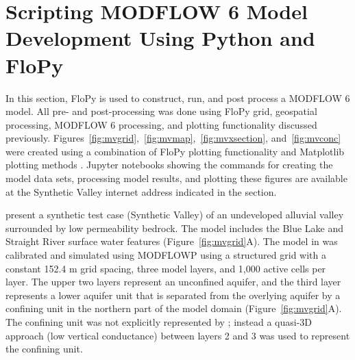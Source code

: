 \documentclass[12pt, oneside]{article}  	%
\begin{document}
\section*{Scripting MODFLOW 6 Model Development Using Python and FloPy}

In this section, FloPy is used to construct, run, and post process a MODFLOW 6 model. All pre- and post-processing was done using FloPy grid, geospatial processing, MODFLOW 6 processing, and plotting functionality discussed previously. Figures~\ref{fig:mvgrid},~\ref{fig:mvmap},~\ref{fig:mvxsection}, and~\ref{fig:mvconc} were created using a combination of FloPy plotting functionality and Matplotlib plotting methods \citep{hunter2007matplotlib}. Jupyter notebooks \citep{Kluyver:2016aa} showing the commands for creating the model data sets, processing model results, and plotting these figures are available at the Synthetic Valley internet address indicated in the  section.

\cite{hill1998} present a synthetic test case (Synthetic Valley) of an undeveloped alluvial valley surrounded by low permeability bedrock. The model includes the Blue Lake and Straight River surface water features (Figure~\ref{fig:mvgrid}A). The model in \cite{hill1998} was calibrated and simulated using MODFLOWP \citep{hill1992computer} using a structured grid with a constant 152.4 m grid spacing, three model layers, and 1,000 active cells per layer. The upper two layers represent an unconfined aquifer, and the third layer represents a lower aquifer unit that is separated from the overlying aquifer by a confining unit in the northern part of the model domain (Figure~\ref{fig:mvgrid}A). The confining unit was not explicitly represented by \cite{hill1998}; instead a quasi-3D approach (low vertical conductance) between layers 2 and 3 was used to represent the confining unit.

\end{document}
